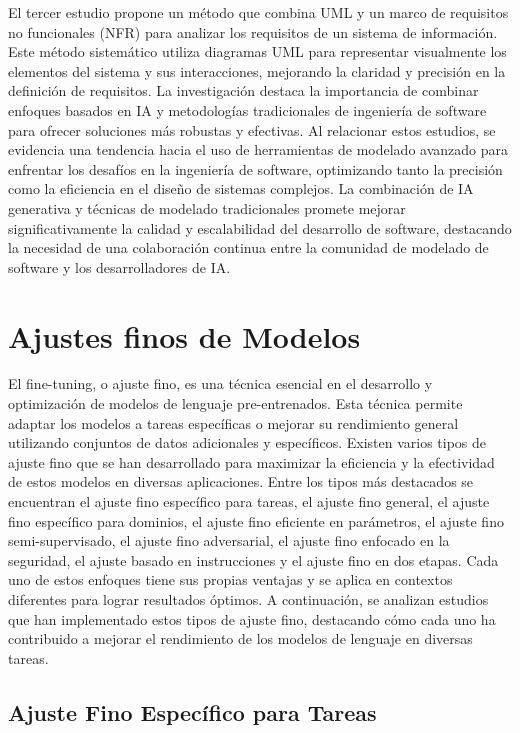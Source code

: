 El tercer estudio \cite{Arif2023} propone un método que combina UML y un marco de requisitos no funcionales (NFR) para analizar los requisitos de un sistema de información. Este método sistemático utiliza diagramas UML para representar visualmente los elementos del sistema y sus interacciones, mejorando la claridad y precisión en la definición de requisitos. La investigación destaca la importancia de combinar enfoques basados en IA y metodologías tradicionales de ingeniería de software para ofrecer soluciones más robustas y efectivas. Al relacionar estos estudios, se evidencia una tendencia hacia el uso de herramientas de modelado avanzado para enfrentar los desafíos en la ingeniería de software, optimizando tanto la precisión como la eficiencia en el diseño de sistemas complejos. La combinación de IA generativa y técnicas de modelado tradicionales promete mejorar significativamente la calidad y escalabilidad del desarrollo de software, destacando la necesidad de una colaboración continua entre la comunidad de modelado de software y los desarrolladores de IA.

\section{Ajustes finos de Modelos}   

El fine-tuning, o ajuste fino, es una técnica esencial en el desarrollo y optimización de modelos de lenguaje pre-entrenados. Esta técnica permite adaptar los modelos a tareas específicas o mejorar su rendimiento general utilizando conjuntos de datos adicionales y específicos. Existen varios tipos de ajuste fino que se han desarrollado para maximizar la eficiencia y la efectividad de estos modelos en diversas aplicaciones. Entre los tipos más destacados se encuentran el ajuste fino específico para tareas, el ajuste fino general, el ajuste fino específico para dominios, el ajuste fino eficiente en parámetros, el ajuste fino semi-supervisado, el ajuste fino adversarial, el ajuste fino enfocado en la seguridad, el ajuste basado en instrucciones y el ajuste fino en dos etapas. Cada uno de estos enfoques tiene sus propias ventajas y se aplica en contextos diferentes para lograr resultados óptimos. A continuación, se analizan estudios que han implementado estos tipos de ajuste fino, destacando cómo cada uno ha contribuido a mejorar el rendimiento de los modelos de lenguaje en diversas tareas.

\subsection{Ajuste Fino Específico para Tareas}

